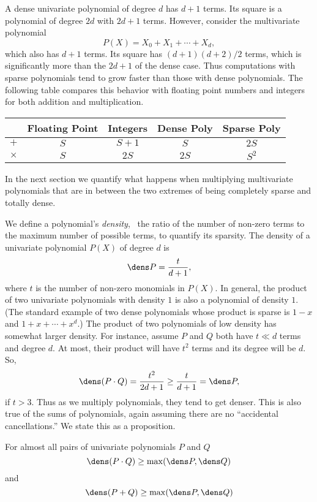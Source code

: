 A dense univariate polynomial of degree $d$ has $d+1$ terms.  Its
square is a polynomial of degree $2d$ with $2d+1$ terms.  However,
consider the multivariate polynomial
\[
P(X) = X_{0} + X_{1} + \cdots + X_{d},
\]
which also has $d+1$ terms.  Its square has $(d+1)(d+2)/2$ terms, which is
significantly more than the $2d+1$ of the dense case.  Thus computations
with sparse polynomials tend to grow faster than those with dense
polynomials.  The following table compares this behavior with floating
point numbers and integers for both addition and multiplication.

\begin{center}
\begin{tabular}{|c|c|c|c|c|} 
   \multicolumn{1}{c}{}
 & \multicolumn{1}{c}{Floating Point}
 & \multicolumn{1}{c}{Integers}
 & \multicolumn{1}{c}{Dense Poly}
 & \multicolumn{1}{c}{Sparse Poly} \\ \hline
$+$ & $S$ & $S+1$ & $S$ & $2S$ \\ \hline
$\times$ & $S$ & $2S$ & $2S$ & $S^{2}$ \\ \hline
\end{tabular}
\end{center}

In the next section we quantify what happens when multiplying multivariate
polynomials that are in between the two extremes of being completely sparse
and totally dense.

We define a polynomial's {\em density\/}, \ie\ the ratio of the number
of non-zero terms to the maximum number of possible terms, to quantify
its sparsity.  The density of a univariate polynomial $P(X)$ of degree
$d$ is
\[
\dens P = \frac{t}{d+1},
\]
where $t$ is the number of non-zero monomials in $P(X)$.  In general,
the product of two univariate polynomials with density $1$ is also a
polynomial of density $1$.  (The standard example of two dense
polynomials whose product is sparse is $1-x$ and $1+ x+ \cdots +
x^{d}$.)  The product of two polynomials of low density has somewhat
larger density.  For instance, assume $P$ and $Q$ both have $t \ll d$
terms and degree $d$.  At most, their product will have $t^{2}$ terms
and its degree will be $d$.  So,
\[
\dens (P \cdot Q) = \frac{t^{2}}{2d+1} \ge \frac{t}{d+1} = \dens P,
\]
if $t > 3$.  Thus as we multiply polynomials, they tend to get denser.
This is also true of the sums of polynomials, again assuming there are
no ``accidental cancellations.''  We state this as a proposition.

\begin{proposition}
\label{Dens:Ineq:Prop}
For almost all pairs of univariate polynomials $P$ and $Q$
\[
\dens (P \cdot Q) \ge \max(\dens P, \dens Q)
\]
and
\[
\dens (P + Q) \ge \max(\dens P, \dens Q)
\]
\end{proposition}

